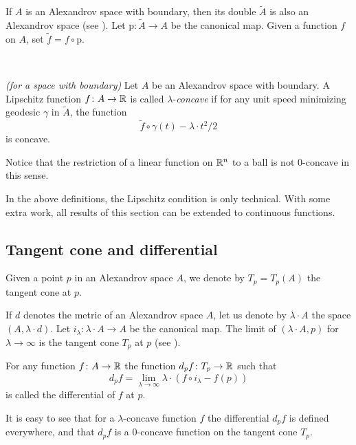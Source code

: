 \documentclass{amsart}
\begin{document}
If $A$ is an Alexandrov space with boundary, then its double $\tilde A$ is also an Alexandrov space (see \cite[5.2]{Per}).
Let $\text{p}\colon \tilde A\to A$ be the canonical map.
Given a function $f$ on $A$, set $\tilde f=f\circ \text{p}$.

\

\begin{defn}{\it (for a space with boundary)}  Let $A$ be an Alexandrov space with boundary. A Lipschitz function $f\colon A \rightarrow {\Bbb R}$ is called
$\lambda$-\emph{concave} if for any unit speed
minimizing geodesic $\gamma$ in $\tilde A$, the function
$$\tilde f\circ\gamma(t)-\lambda\cdot  t^2/2 $$
is concave.
\end{defn}


\begin{rmk}Notice that the restriction of a linear function on ${\Bbb R}^n$ to a ball is not $0$-concave in this sense.
\end{rmk}

\begin{rmk}
In the above definitions, the Lipschitz condition is only technical.
With some extra work,
all results of this section can be extended to continuous functions.
\end{rmk}

\subsection{Tangent cone and differential} Given a point $p$ in an Alexandrov space  $A$, we denote by $T_p=T_p(A)$ the tangent cone at $p$.

If $d$ denotes the metric of an Alexandrov space $A$,
let us denote by $\lambda\cdot  A$ the space $(A,\lambda\cdot  d)$.
Let $i_\lambda\colon  \lambda\cdot  A\to A$ be the canonical map.
The limit of $(\lambda\cdot  A,p)$ for $\lambda\to\infty$ is  the tangent cone $T_p$ at $p$ (see \cite[ 7.8.1]{BGP}).

\begin{defn} For any function $f\colon A \rightarrow {\Bbb R}$ the function $d_pf\colon T_p \rightarrow {\Bbb R}$ such that
$$d_pf=\lim_{\lambda\to\infty} \lambda\cdot (f\circ i_\lambda-f(p))$$
is called the differential of $f$ at $p$.
\end{defn}

It is easy to see that for a $\lambda$-concave function $f$
the differential $d_pf$ is defined everywhere, and that $d_pf$
is a $0$-concave function on the tangent cone $T_p$.
\end{document}
